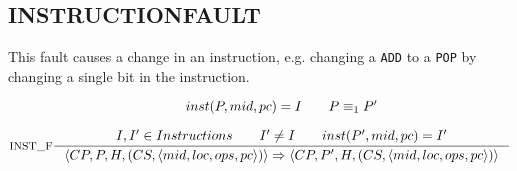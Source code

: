 \subsection{INSTRUCTIONFAULT}
This fault causes a change in an instruction, e.g. changing a \texttt{ADD} to a \texttt{POP} by changing a single bit in the instruction.

$$\inference[INST\_F]{
inst(P,mid, pc) = I \semsp
P \equiv_1 P' \semnl \\
I,I' \in Instructions \semsp
I' \neq I \semsp
inst(P',mid, pc) = I'
}
{\langle CP, P, H, (CS, \langle mid, loc, ops, pc \rangle) \rangle \Rightarrow \langle CP, P', H, (CS, \langle mid, loc, ops, pc \rangle)\rangle }$$
